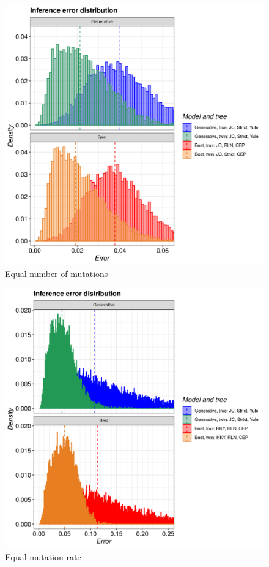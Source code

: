 \begin{figure}[H]
  \includegraphics[width=\textwidth]{pirouette_example_3/example_3_314/errors.png}
  \caption{Equal number of mutations}
\end{figure}

\begin{figure}[H]
  \includegraphics[width=\textwidth]{pirouette_example_18/example_18_314/errors.png}
  \caption{Equal mutation rate}
\end{figure}

